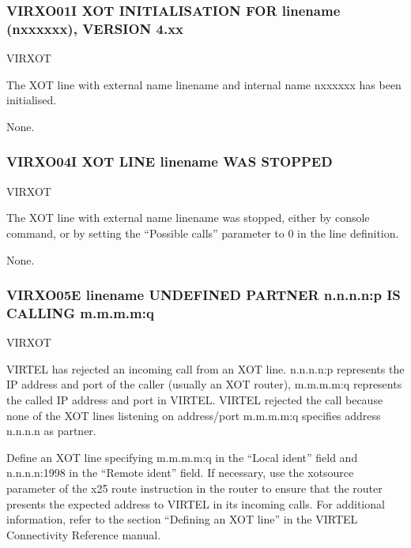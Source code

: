 \documentclass[letterpaper,10pt,english]{sphinxmanual}
\begin{document}
\subsubsection{VIRXO01I XOT INITIALISATION FOR linename (n\sphinxhyphen{}xxxxxx), VERSION 4.xx}
\label{\detokenize{messages:virxo01i-xot-initialisation-for-linename-n-xxxxxx-version-4-xx}}\begin{description}
\sphinxAtStartPar
VIRXOT

\sphinxAtStartPar
The XOT line with external name linename and internal name n\sphinxhyphen{}xxxxxx has been initialised.

\sphinxAtStartPar
None.

\end{description}


\subsubsection{VIRXO04I XOT LINE linename WAS STOPPED}
\label{\detokenize{messages:virxo04i-xot-line-linename-was-stopped}}\begin{description}
\sphinxAtStartPar
VIRXOT

\sphinxAtStartPar
The XOT line with external name linename was stopped, either by console command, or by setting the “Possible calls” parameter to 0 in the line definition.

\sphinxAtStartPar
None.

\end{description}


\subsubsection{VIRXO05E linename UNDEFINED PARTNER n.n.n.n:p IS CALLING m.m.m.m:q}
\label{\detokenize{messages:virxo05e-linename-undefined-partner-n-n-n-n-p-is-calling-m-m-m-m-q}}\begin{description}
\sphinxAtStartPar
VIRXOT

\sphinxAtStartPar
VIRTEL has rejected an incoming call from an XOT line. n.n.n.n:p represents the IP address and port of the caller (usually an XOT router), m.m.m.m:q represents the called IP address and port in VIRTEL. VIRTEL rejected the call because none of the XOT lines listening on address/port m.m.m.m:q specifies address n.n.n.n as partner.

\sphinxAtStartPar
Define an XOT line specifying m.m.m.m:q in the “Local ident” field and n.n.n.n:1998 in the “Remote ident” field. If necessary, use the xot\sphinxhyphen{}source parameter of the x25 route instruction in the router to ensure that the router presents the expected address to VIRTEL in its incoming calls. For additional information, refer to the section “Defining an XOT line” in the VIRTEL Connectivity Reference manual.

\end{description}
\end{document}
